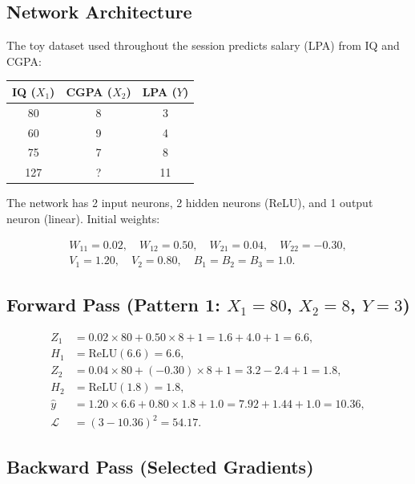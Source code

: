 \documentclass[12pt,a4paper]{article}
\begin{document}
\subsection{Network Architecture}

The toy dataset used throughout the session predicts salary (LPA) from IQ and
CGPA:

\begin{center}
\begin{tabular}{ccc}
\toprule
IQ ($X_1$) & CGPA ($X_2$) & LPA ($Y$) \\
\midrule
80 & 8  & 3 \\
60 & 9  & 4 \\
75 & 7  & 8 \\
127 & ?  & 11 \\
\bottomrule
\end{tabular}
\end{center}

The network has 2 input neurons, 2 hidden neurons (ReLU), and 1 output neuron
(linear).  Initial weights:

\begin{align*}
  W_{11} = 0.02,\quad W_{12} = 0.50,\quad
  W_{21} = 0.04,\quad W_{22} = -0.30,\\
  V_1 = 1.20,\quad V_2 = 0.80,\quad
  B_1 = B_2 = B_3 = 1.0.
\end{align*}

\subsection{Forward Pass (Pattern 1: $X_1=80$, $X_2=8$, $Y=3$)}

\begin{align}
  Z_1 &= 0.02\times80 + 0.50\times8 + 1 = 1.6 + 4.0 + 1 = 6.6,\\
  H_1 &= \text{ReLU}(6.6) = 6.6,\\
  Z_2 &= 0.04\times80 + (-0.30)\times8 + 1 = 3.2 - 2.4 + 1 = 1.8,\\
  H_2 &= \text{ReLU}(1.8) = 1.8,\\
  \hat{y} &= 1.20\times6.6 + 0.80\times1.8 + 1.0 = 7.92 + 1.44 + 1.0 = 10.36,\\
  \mathcal{L} &= (3 - 10.36)^{2} = 54.17.
\end{align}

\subsection{Backward Pass (Selected Gradients)}
\end{document}
